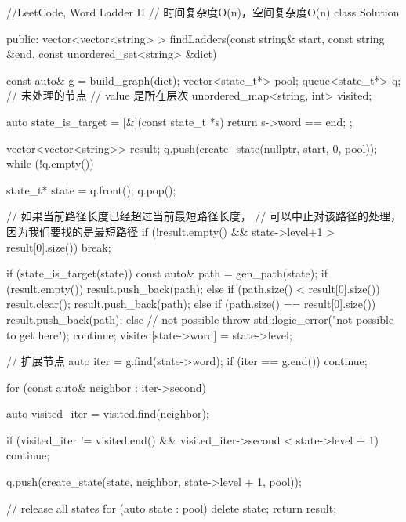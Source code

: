 \begin{Code}
//LeetCode, Word Ladder II
// 时间复杂度O(n)，空间复杂度O(n)
class Solution {
public:
    vector<vector<string> > findLadders(const string& start,
            const string &end, const unordered_set<string> &dict) {
        const auto& g = build_graph(dict);
        vector<state_t*> pool;
        queue<state_t*> q; // 未处理的节点
        // value 是所在层次
        unordered_map<string, int> visited;

        auto state_is_target = [&](const state_t *s) {return s->word == end; };

        vector<vector<string>> result;
        q.push(create_state(nullptr, start, 0, pool));
        while (!q.empty()) {
            state_t* state = q.front();
            q.pop();

            // 如果当前路径长度已经超过当前最短路径长度，
            // 可以中止对该路径的处理，因为我们要找的是最短路径
            if (!result.empty() && state->level+1 > result[0].size()) break;

            if (state_is_target(state)) {
                const auto& path = gen_path(state);
                if (result.empty()) {
                    result.push_back(path);
                } else {
                    if (path.size() < result[0].size()) {
                        result.clear();
                        result.push_back(path);
                    } else if (path.size() == result[0].size()) {
                        result.push_back(path);
                    } else {
                        // not possible
                        throw std::logic_error("not possible to get here");
                    }
                }
                continue;
            }
            visited[state->word] = state->level;

            // 扩展节点
            auto iter = g.find(state->word);
            if (iter == g.end()) continue;

            for (const auto& neighbor : iter->second) {
                auto visited_iter = visited.find(neighbor);

                if (visited_iter != visited.end() && 
                    visited_iter->second < state->level + 1) {
                    continue;
                }

                q.push(create_state(state, neighbor, state->level + 1, pool));
            }
        }

        // release all states
        for (auto state : pool) {
            delete state;
        }
        return result;
    }

}
\end{Code}
